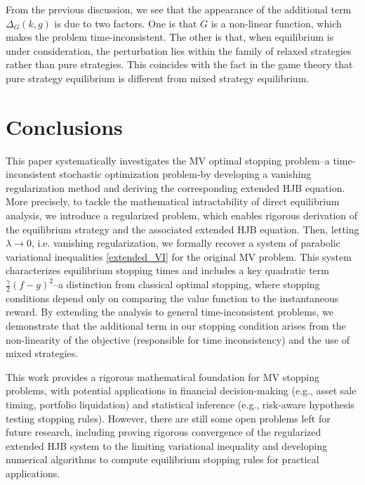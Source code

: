 \documentclass[11pt]{article}
\begin{document}
From the previous discussion, we see that the appearance of  the additional term $\Delta_G(k,g)$ is due to two factors.  One is that  $G$ is a non-linear function, which makes the problem time-inconsistent. The other is that, when equilibrium is under consideration, the perturbation lies within the family of relaxed strategies rather than  pure strategies. This coincides with the fact in the game theory that pure strategy equilibrium is different from mixed strategy equilibrium.      

\section{{Conclusions}}

This paper systematically investigates the MV  optimal stopping problem--a time-inconsistent stochastic optimization problem-by developing a vanishing regularization method and deriving the corresponding extended HJB equation.  More precisely, to tackle the mathematical intractability of direct equilibrium analysis, we introduce a regularized problem, which enables rigorous derivation of the equilibrium strategy and the associated extended HJB equation. Then, letting $\lambda \rightarrow 0$, i.e. vanishing regularization, we formally recover a system of parabolic variational inequalities \eqref{extended_VI} for the original MV problem. This system characterizes equilibrium stopping times and includes a key quadratic term  $\frac{\gamma}{2}(f-g)^2$--a distinction from classical optimal stopping, where stopping conditions depend only on comparing the value function to the instantaneous reward. By extending the analysis to general time-inconsistent problems, we demonstrate that the additional term in our stopping condition arises from the non-linearity of the objective (responsible for time inconsistency) and the use of mixed strategies.

This work provides a rigorous mathematical foundation for MV stopping problems, with potential applications in financial decision-making (e.g., asset sale timing, portfolio liquidation) and statistical inference (e.g., risk-aware hypothesis testing stopping rules).  However, there are still some open problems left for future research, including
proving rigorous convergence of the regularized extended HJB system to the limiting variational inequality and developing numerical algorithms to compute equilibrium stopping rules for practical applications.




\appendix
\end{document}
